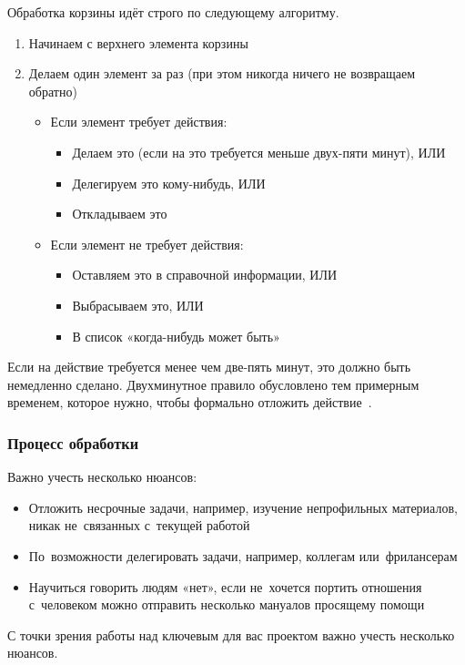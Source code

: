 \documentclass{../industrial-development}
\begin{document}
\lecturenotes

Обработка корзины идёт строго по следующему алгоритму.
\begin{enumerate}
\item Начинаем с верхнего элемента корзины
\item Делаем один элемент за раз (при этом никогда ничего не возвращаем обратно)
  \begin{itemize}
  \item Если элемент требует действия:
    \begin{itemize}
    \item Делаем это (если на это требуется меньше двух-пяти минут), ИЛИ
    \item Делегируем это кому-нибудь, ИЛИ
    \item Откладываем это
    \end{itemize}
  \item Если элемент не требует действия:
    \begin{itemize}
    \item Оставляем это в справочной информации, ИЛИ
    \item Выбрасываем это, ИЛИ
    \item В список «когда-нибудь может быть»
    \end{itemize}
  \end{itemize}
\end{enumerate}
Если на действие требуется менее чем две-пять минут, это должно быть немедленно сделано. Двухминутное правило обусловлено тем примерным временем, которое нужно, чтобы формально отложить действие~\cite{GTDWikipedia}.

\begin{frame} \frametitle{Процесс обработки}
Важно учесть несколько нюансов:
  \begin{itemize}
  \item Отложить несрочные задачи, например, изучение непрофильных материалов, никак не~связанных с~текущей работой
  \item По~возможности делегировать задачи, например, коллегам или~фрилансерам
  \item Научиться говорить людям «нет», если не~хочется портить отношения с~человеком можно отправить несколько мануалов просящему помощи
  \end{itemize}
\end{frame}

\lecturenotes

С точки зрения работы над ключевым для вас проектом важно учесть несколько нюансов.
\end{document}
